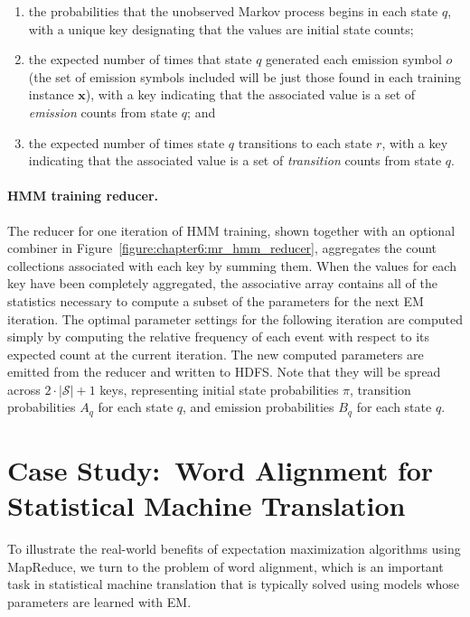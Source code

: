 \begin{enumerate}
\item the probabilities that the unobserved Markov process begins in
  each state $q$, with a unique key designating that the values are
  initial state counts;

\item the expected number of times that state $q$ generated each
  emission symbol $o$ (the set of emission symbols included will be
  just those found in each training instance $\textbf{x}$), with a key
  indicating that the associated value is a set of \emph{emission}
  counts from state $q$; and

\item the expected number of times state $q$ transitions to each state
  $r$, with a key indicating that the associated value is a set of
  \emph{transition} counts from state $q$.

\end{enumerate}

\paragraph{\bf HMM training reducer.} 
The reducer for one iteration of HMM training, shown together with an
optional combiner in Figure~\ref{figure:chapter6:mr_hmm_reducer},
aggregates the count collections associated with each key by summing
them.  When the values for each key have been completely aggregated,
the associative array contains all of the statistics necessary to
compute a subset of the parameters for the next EM iteration.  The
optimal parameter settings for the following iteration are computed
simply by computing the relative frequency of each event with respect
to its expected count at the current iteration.  The new computed
parameters are emitted from the reducer and written to HDFS.  Note
that they will be spread across $2\cdot | \mathcal{S} |+1$ keys,
representing initial state probabilities $\pi$, transition
probabilities $A_q$ for each state $q$, and emission probabilities
$B_q$ for each state $q$.


\section{Case Study:\ Word Alignment for Statistical Machine Translation}
\label{chapter6_word_alignment}

To illustrate the real-world benefits of expectation maximization
algorithms using MapReduce, we turn to the problem of word alignment,
which is an important task in statistical machine translation that is
typically solved using models whose parameters are learned with EM.

